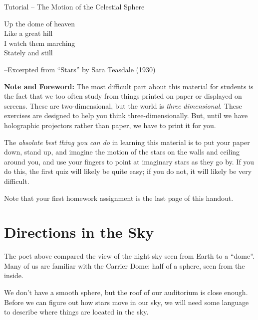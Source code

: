 \documentclass[12pt]{article}
\newcommand{\BS}{\bigskip}
\begin{document}
	\begin{center}\sc \Large Tutorial -- The Motion of the Celestial Sphere 
		

\small

	\it 

Up the dome of heaven \\
Like a great hill \\
I watch them marching \\ 
Stately and still \\


\BS

\begin{flushright} \rm --Excerpted from ``Stars'' by Sara Teasdale (1930) \end{flushright}

\end{center}

	\normalsize
	
	{\bf Note and Foreword:} The most difficult part about this material for students is the fact that we too often study from things printed on paper or displayed on screens. These are two-dimensional, but the world is {\it three dimensional}. These exercises are designed to help you think three-dimensionally. But, until we have holographic projectors rather than paper, we have to print it for you.
	
	The {\it absolute best thing you can do} in learning this material is to put your paper down, stand up, and imagine the motion of the stars on the walls and ceiling around you, and use your fingers to point at imaginary stars as they go by. If you do this, the first quiz will likely be quite easy; if you do not, it will likely be very difficult.
	
	Note that your first homework assignment is the last page of this handout.
	

	\section{Directions in the Sky}
	
	The poet above compared the view of the night sky seen from Earth to a ``dome''. Many of us are familiar with the Carrier Dome: half of a sphere, seen from the inside.
	
	We don't have a smooth sphere, but the roof of our auditorium is close enough. Before we can figure out how stars move in our sky, we will need some language to describe where things are located in the sky. 
	
\end{document}
